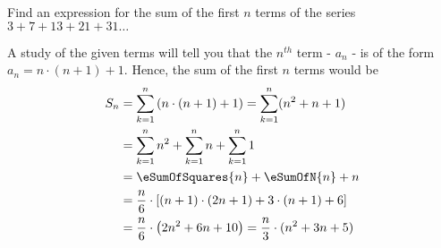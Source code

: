 
%
%
%
%
% 
% 

\question[3] Find an expression for the sum of the first $n$ terms of the series 
$3 + 7 + 13 + 21 + 31 \ldots$


\ifprintanswers
\fi 

\begin{solution}[\halfpage]
	A study of the given terms will tell you that the $n^{th}$ term - $a_n$ - is of the
	form $a_n = n\cdot(n+1) + 1$. Hence, the sum of the first $n$ terms would be
	\begin{align}
		S_n &= \sum_{k=1}^{n}\left(n\cdot(n+1)+1\right) = \sum_{k=1}^{n}(n^2+n + 1) \\
		&= \sum_{k=1}^{n}n^2 + \sum_{k=1}^{n}n + \sum_{k=1}^{n}1 \\
		&= \eSumOfSquares{n} + \eSumOfN{n} + n \\
		&= \dfrac{n}{6}\cdot\left[ (n+1)\cdot(2n+1) + 3\cdot(n+1) + 6 \right] \\
		&= \dfrac{n}{6}\cdot\left( 2n^2 + 6n + 10\right) = \dfrac{n}{3}\cdot(n^2+3n+5)
	\end{align}
\end{solution}
